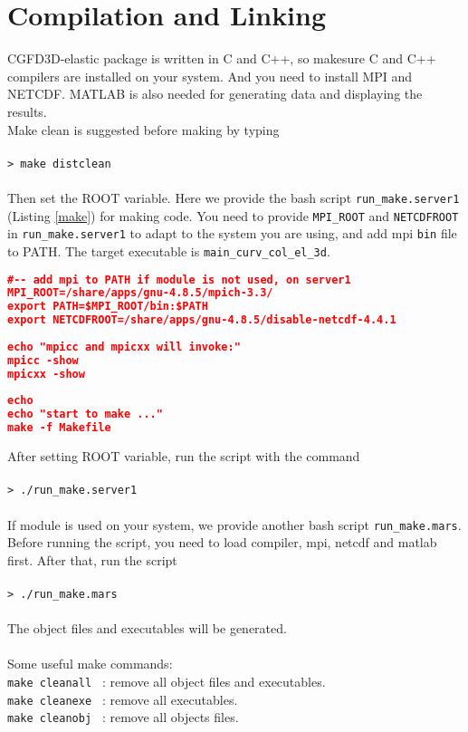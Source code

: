 \section{Compilation and Linking} \label{compile}
CGFD3D-elastic package is written in C and C++, so makesure C and C++ compilers are installed on your system. And you need to install MPI and NETCDF. MATLAB is also needed for generating data and displaying the results. \\
Make clean is suggested before making by typing \\
~\\
\verb|> make distclean| \\
~\\
Then set the ROOT variable. Here we provide the bash script \verb|run_make.server1| (Listing \ref{make}) for making code. You need to provide \verb|MPI_ROOT| and \verb|NETCDFROOT| in \verb|run_make.server1| to adapt to the system you are using, and add mpi \verb|bin| file to PATH. The  target executable is \verb|main_curv_col_el_3d|. 
\begin{lstlisting}[language=json,
	caption=run\_make.server1,
	label={make},
	frame=tb]
#-- add mpi to PATH if module is not used, on server1
MPI_ROOT=/share/apps/gnu-4.8.5/mpich-3.3/
export PATH=$MPI_ROOT/bin:$PATH
export NETCDFROOT=/share/apps/gnu-4.8.5/disable-netcdf-4.4.1
	
echo "mpicc and mpicxx will invoke:"
mpicc -show
mpicxx -show
	
echo
echo "start to make ..."
make -f Makefile
\end{lstlisting}
After setting ROOT variable, run the script with the command \\
~\\
\verb|> ./run_make.server1| \\
~\\
If module is used on your system, we provide another bash script \verb|run_make.mars|. Before running the script, you need to load compiler, mpi, netcdf and matlab first. After that, run the script\\
~\\
\verb|> ./run_make.mars| \\
~\\
The object files and executables will be generated.\\
~\\
Some useful make commands: \\
\verb|make cleanall | : remove all object files and executables. \\
\verb|make cleanexe | : remove all executables. \\
\verb|make cleanobj | : remove all objects files. 


